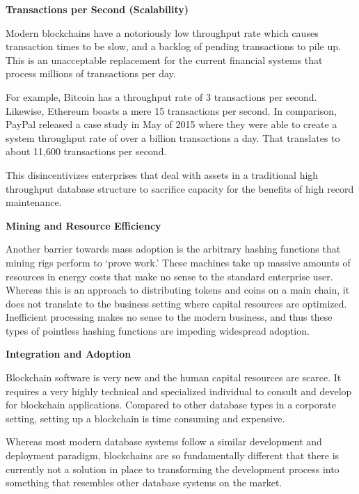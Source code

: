 \documentclass{%
	article}
\begin{document}
\begin{center}
\textbf{Transactions per Second (Scalability)}
\end{center}

Modern blockchains have a notoriously low throughput rate which causes transaction times to be slow, and a backlog of pending transactions to pile up. This is an unacceptable replacement for the current financial systems that process millions of transactions per day.

For example, Bitcoin has a throughput rate of 3 transactions per second. Likewise, Ethereum boasts a mere 15 transactions per second\cite{transactbandwidth}. In comparison, PayPal released a case study in May of 2015 where they were able to create a system throughput rate of over a billion transactions a day. That translates to about 11,600 transactions per second\cite{paypalcasestudy}.

This disincentivizes enterprises that deal with assets in a traditional high throughput database structure to sacrifice capacity for the benefits of high record maintenance.

\begin{center}
\textbf{Mining and Resource Efficiency}
\end{center}

Another barrier towards mass adoption is the arbitrary hashing functions that mining rigs perform to ‘prove work.’ These machines take up massive amounts of resources in energy costs that make no sense to the standard enterprise user. Whereas this is an approach to distributing tokens and coins on a main chain, it does not translate to the business setting where capital resources are optimized. Inefficient processing makes no sense to the modern business, and thus these types of pointless hashing functions are impeding widespread adoption.

\begin{center}
\textbf{Integration and Adoption}
\end{center}
Blockchain software is very new and the human capital resources are scarce. It requires a very highly technical and specialized individual to consult and develop for blockchain applications. Compared to other database types in a corporate setting, setting up a blockchain is time consuming and expensive. 

Whereas most modern database systems follow a similar development and deployment paradigm, blockchains are so fundamentally different that there is currently not a solution in place to transforming the development process into something that resembles other database systems on the market.
\end{document}
